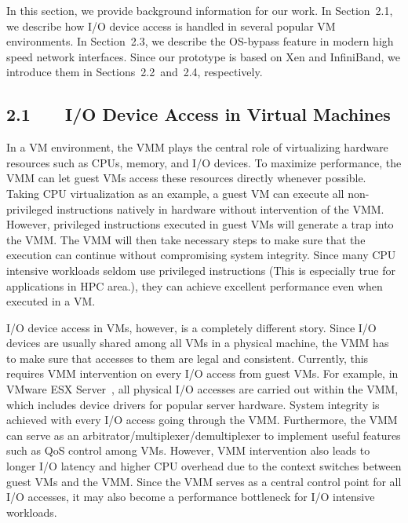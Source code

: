 \documentclass[12pt]{article}
\begin{document}
\setlength{\parskip}{8.04pt}
{\fontsize{13pt}{15.6pt}\selectfont In this section, we provide background information for our work. In Section 2.1, we describe how I/O device access is handled in several popular VM environments. In Section 2.3, we describe the OS-bypass feature in modern high speed network interfaces. Since our prototype is based on Xen and InfiniBand, we introduce them in Sections 2.2 and 2.4, respectively.\par}\par

\subsection*{2.1 \ \ \  I/O Device Access in Virtual Machines}
\setlength{\parskip}{0.0pt}
{\fontsize{13pt}{15.6pt}\selectfont In a VM environment, the VMM plays the central role of virtualizing hardware resources such as CPUs, memory, and I/O devices. To maximize performance, the VMM can let guest VMs access these resources directly whenever possible. Taking CPU virtualization as an example, a guest VM can execute all non-privileged instructions natively in hardware without intervention of the VMM. However, privileged instructions executed in guest VMs will generate a trap into the VMM. The VMM will then take necessary steps to make sure that the execution can continue without compromising system integrity. Since many CPU intensive workloads seldom use privileged instructions (This is especially true for applications in HPC area.), they can achieve excellent performance even when executed in a VM.\par}\par

\setlength{\parskip}{5.04pt}
{\fontsize{13pt}{15.6pt}\selectfont I/O device access in VMs, however, is a completely different story. Since I/O devices are usually shared among all VMs in a physical machine, the VMM has to make sure that accesses to them are legal and consistent. Currently, this requires VMM intervention on every I/O access from guest VMs. For example, in VMware ESX Server , all physical I/O accesses are carried out within the VMM, which includes device drivers for popular server hardware. System integrity is achieved with every I/O access going through the VMM. Furthermore, the VMM can serve as an arbitrator/multiplexer/demultiplexer to implement useful features such as QoS control among VMs. However, VMM intervention also leads to longer I/O latency and higher CPU overhead due to the context switches between guest VMs and the VMM. Since the VMM serves as a central control point for all I/O accesses, it may also become a performance bottleneck for I/O intensive workloads.\par}\par
\end{document}
